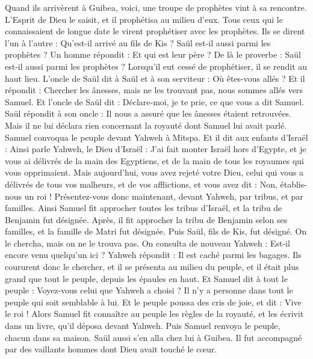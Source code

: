 \begin{multicols}{2}
Quand ils arrivèrent à Guibea, voici, une troupe de prophètes vint à sa rencontre. L'Esprit de Dieu le saisit, et il prophétisa au milieu d'eux.
Tous ceux qui le connaissaient de longue date le virent prophétiser avec les prophètes. Ils se dirent l'un à l'autre : Qu'est-il arrivé au fils de Kis ? Saül est-il aussi parmi les prophètes ?
Un homme répondit : Et qui est leur père ? De là le proverbe : Saül est-il aussi parmi les prophètes ?
Lorsqu’il eut cessé de prophétiser, il se rendit au haut lieu.
L'oncle de Saül dit à Saül et à son serviteur : Où êtes-vous allés ? Et il répondit : Chercher les ânesses, mais ne les trouvant pas, nous sommes allés vers Samuel.
Et l’oncle de Saül dit : Déclare-moi, je te prie, ce que vous a dit Samuel.
Saül répondit à son oncle : Il nous a assuré que les ânesses étaient retrouvées. Mais il ne lui déclara rien concernant la royauté dont Samuel lui avait parlé.
Samuel convoqua le peuple devant Yahweh à Mitspa.
Et il dit aux enfants d'Israël : Ainsi parle Yahweh, le Dieu d'Israël : J'ai fait monter Israël hors d'Egypte, et je vous ai délivrés de la main des Egyptiens, et de la main de tous les royaumes qui vous opprimaient.
Mais aujourd'hui, vous avez rejeté votre Dieu, celui qui vous a délivrés de tous vos malheurs, et de vos afflictions, et vous avez dit : Non, établis-nous un roi ! Présentez-vous donc maintenant, devant Yahweh, par tribus, et par familles.
Ainsi Samuel fit approcher toutes les tribus d'Israël, et la tribu de Benjamin fut désignée.
Après, il fit approcher la tribu de Benjamin selon ses familles, et la famille de Matri fut désignée. Puis Saül, fils de Kis, fut désigné. On le chercha, mais on ne le trouva pas.
On consulta de nouveau Yahweh : Est-il encore venu quelqu’un ici ? Yahweh répondit : Il est caché parmi les bagages.
Ils coururent donc le chercher, et il se présenta au milieu du peuple, et il était plus grand que tout le peuple, depuis les épaules en haut.
Et Samuel dit à tout le peuple : Voyez-vous celui que Yahweh a choisi ? Il n'y a personne dans tout le peuple qui soit semblable à lui. Et le peuple poussa des cris de joie, et dit : Vive le roi !
Alors Samuel fit connaître au peuple les règles de la royauté, et les écrivit dans un livre, qu’il déposa devant Yahweh. Puis Samuel renvoya le peuple, chacun dans sa maison.
Saül aussi s'en alla chez lui à Guibea. Il fut accompagné par des vaillants hommes dont Dieu avait touché le cœur.

\end{multicols}
